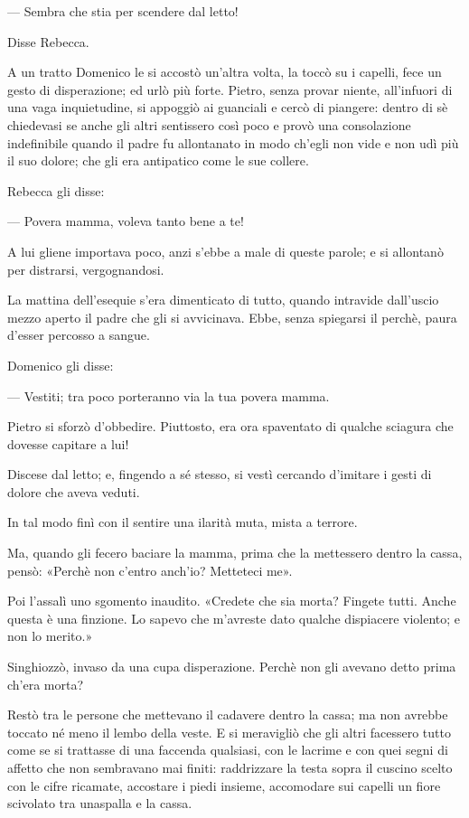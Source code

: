 — Sembra che stia per scendere dal letto!

Disse Rebecca.

A un tratto Domenico le si accostò un'altra volta, la toccò su i capelli, fece un gesto di disperazione; ed urlò più forte. Pietro, senza provar niente, all'infuori di una vaga inquietudine, si appoggiò ai guanciali e cercò di piangere: dentro di sè chiedevasi se anche gli altri sentissero così poco e provò una consolazione indefinibile quando il padre fu allontanato in modo ch'egli non vide e non udì più il suo dolore; che gli era antipatico come le sue collere.

Rebecca gli disse:

— Povera mamma, voleva tanto bene a te!

A lui gliene importava poco, anzi s'ebbe a male di queste parole; e si allontanò per distrarsi, vergognandosi.

La mattina dell'esequie s'era dimenticato di tutto, quando intravide dall'uscio mezzo aperto il padre che gli si avvicinava. Ebbe, senza spiegarsi il perchè, paura d'esser percosso a sangue.

Domenico gli disse:

— Vestiti; tra poco porteranno via la tua povera mamma.

Pietro si sforzò d'obbedire. Piuttosto, era ora spaventato di qualche sciagura che dovesse capitare a lui!

Discese dal letto; e, fingendo a sé stesso, si vestì cercando d'imitare i gesti di dolore che aveva veduti.

In tal modo finì con il sentire una ilarità muta, mista a terrore.

Ma, quando gli fecero baciare la mamma, prima che la mettessero dentro la cassa, pensò: «Perchè non c'entro anch'io? Metteteci me».

Poi l'assalì uno sgomento inaudito. «Credete che sia morta? Fingete tutti. Anche questa è una finzione. Lo sapevo che m'avreste dato qualche dispiacere violento; e non lo merito.»

Singhiozzò, invaso da una cupa disperazione. Perchè non gli avevano detto prima ch'era morta?

Restò tra le persone che mettevano il cadavere dentro la cassa; ma non avrebbe toccato né meno il lembo della veste. E si meravigliò che gli altri facessero tutto come se si trattasse di una faccenda qualsiasi, con le lacrime e con quei segni di affetto che non sembravano mai finiti: raddrizzare la testa sopra il cuscino scelto con le cifre ricamate, accostare i piedi insieme, accomodare sui capelli un fiore scivolato tra unaspalla e la cassa.

